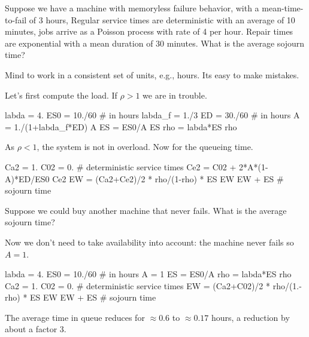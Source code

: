 \begin{exercise}
  Suppose we have a machine with memoryless failure behavior, with a mean-time-to-fail of $3$ hours, Regular service times are deterministic with an average of 10 minutes, jobs arrive as a Poisson process with rate of 4 per hour.  Repair times are exponential with a mean duration of 30 minutes. What is the average sojourn time?
  \begin{hint}
    Mind to work in a consistent set of units, e.g., hours. Its easy to make mistakes. 
  \end{hint}
  \begin{solution}
Let's first compute the load. If $\rho>1$ we are in trouble.
    \begin{pyconsole}
labda = 4.
ES0 = 10./60 # in hours
labda_f = 1./3
ED = 30./60 # in hours
A = 1./(1+labda_f*ED)
A
ES = ES0/A
ES
rho = labda*ES
rho
    \end{pyconsole}
As $\rho<1$, the system is not in overload. Now for the queueing time.
\begin{pyconsole}
Ca2 = 1.
C02 = 0. # deterministic service times
Ce2 = C02 + 2*A*(1-A)*ED/ES0
Ce2
EW = (Ca2+Ce2)/2 * rho/(1-rho) * ES
EW
EW + ES # sojourn time
\end{pyconsole}
  \end{solution}
\end{exercise}

\begin{exercise}
  Suppose we could buy another machine that never fails. What is the average sojourn time?
  \begin{solution}
Now we don't need to take availability into account: the machine never fails so $A=1$. 
    \begin{pyconsole}
labda = 4.
ES0 = 10./60 # in hours
A = 1
ES = ES0/A
rho = labda*ES
rho
Ca2 = 1.
C02 = 0. # deterministic service times
EW = (Ca2+C02)/2 * rho/(1.-rho) * ES
EW
EW + ES # sojourn time
\end{pyconsole}
The average time in queue reduces for $\approx 0.6$ to $\approx 0.17$ hours, a reduction by about a factor 3. 
\end{solution}
\end{exercise}

